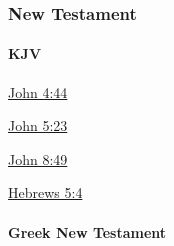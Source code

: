 		
		
	\subsubsection{New Testament} %
		\label{HONOR-NT}
	
		\paragraph{KJV}
			\label{HONOR-NT-KJV}		
	
			
			\begin{compactdesc}
				\item[{\hyperref[JOHN-4-44]{John 4:44}}]
				\item[{\hyperref[JOHN-5-23]{John 5:23}}]
				\item[{\hyperref[JOHN-8-49]{John 8:49}}]
				\item[{\hyperref[HEBREWS-5-4]{Hebrews 5:4}}]
			\end{compactdesc}
			
		\paragraph{Greek New Testament} %
			\label{HONOR-GREEK}
		
			\subparagraph{\texorpdfstring{}{}}
				\label{TIME-2}
			
